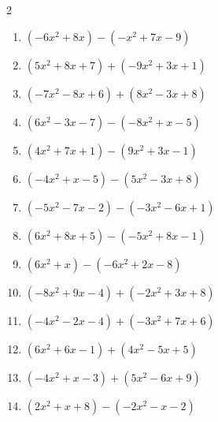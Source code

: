 \begin{multicols}{2}
\begin{enumerate}

  \item $(-6x^{2}+8x)-(-x^{2}+7x-9)$


  \item $(5x^{2}+8x+7)+(-9x^{2}+3x+1)$


  \item $(-7x^{2}-8x+6)+(8x^{2}-3x+8)$


  \item $(6x^{2}-3x-7)-(-8x^{2}+x-5)$


  \item $(4x^{2}+7x+1)-(9x^{2}+3x-1)$


  \item $(-4x^{2}+x-5)-(5x^{2}-3x+8)$


  \item $(-5x^{2}-7x-2)-(-3x^{2}-6x+1)$


  \item $(6x^{2}+8x+5)-(-5x^{2}+8x-1)$


  \item $(6x^{2}+x)-(-6x^{2}+2x-8)$


  \item $(-8x^{2}+9x-4)+(-2x^{2}+3x+8)$


  \item $(-4x^{2}-2x-4)+(-3x^{2}+7x+6)$


  \item $(6x^{2}+6x-1)+(4x^{2}-5x+5)$


  \item $(-4x^{2}+x-3)+(5x^{2}-6x+9)$


  \item $(2x^{2}+x+8)-(-2x^{2}-x-2)$


\end{enumerate}
\end{multicols}
